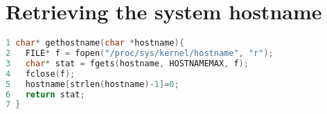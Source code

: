 \section{Retrieving the system hostname}
\label{gethostname}
\begin{lstlisting}[language=C]
1 char* gethostname(char *hostname){
2   FILE* f = fopen("/proc/sys/kernel/hostname", "r");
3   char* stat = fgets(hostname, HOSTNAMEMAX, f);
4   fclose(f);
5   hostname[strlen(hostname)-1]=0;
6   return stat;
7 }
\end{lstlisting}

